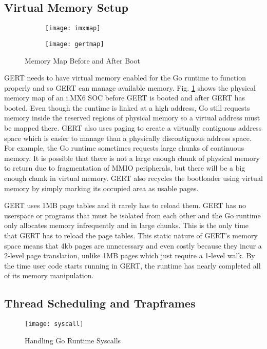 \subsection{Virtual Memory Setup}
\begin{figure}[h]
  \begin{subfigure}[t!]{0.5\textwidth}
 \texttt{[image: imxmap]}
  \end{subfigure}
  \begin{subfigure}[t!]{0.5\textwidth}
 \texttt{[image: gertmap]}
  \end{subfigure}
  \caption{Memory Map Before and After Boot} \label{fig:gertmap}
\end{figure}

GERT needs to have virtual memory enabled for the Go runtime to function properly and so
GERT can manage available memory. Fig. \ref{fig:gertmap} shows the physical memory map
of an i.MX6 SOC before GERT is booted and after GERT has booted.
Even though the
runtime is linked at a high address, Go still requests memory inside the reserved regions of physical
memory so a virtual address must be mapped there. GERT also uses paging to create a virtually contiguous
address space which is easier to manage than a physically discontiguous address space. For example,
the Go runtime sometimes requests large chunks of continuous memory. It is possible that there is not
a large enough chunk of physical memory to return due to fragmentation of MMIO peripherals, but there
will be a big enough chunk in virtual memory. GERT also recycles the bootloader using virtual
memory by simply marking its occupied area as usable pages.

GERT uses 1MB page tables and it rarely has to reload them. GERT has no userspace or programs
that must be isolated from each other and the Go runtime only allocates memory infrequently
and in large chunks. This is the only time that GERT has to reload the page tables.
This static nature of GERT's memory space means that 4kb pages are unnecessary
and even costly because they incur a 2-level page translation, unlike 1MB pages which just require
a 1-level walk. By the time user code starts running in GERT, the runtime has nearly completed
all of its memory manipulation.

\subsection{Thread Scheduling and Trapframes}
\begin{figure}[h]
\begin{center}
  \texttt{[image: syscall]}
\end{center}
  \caption{Handling Go Runtime Syscalls} \label{fig:syscall}
\end{figure}

